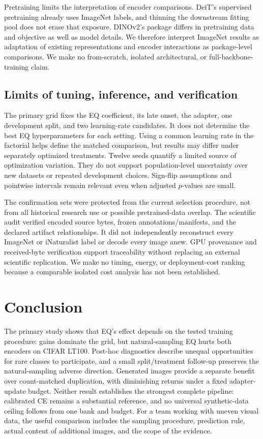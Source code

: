 \documentclass[conference]{IEEEtran}
\begin{document}
Pretraining limits the interpretation of encoder comparisons. DeiT's supervised pretraining already uses ImageNet labels, and thinning the downstream fitting pool does not erase that exposure. DINOv2's package differs in pretraining data and objective as well as model details. We therefore interpret ImageNet results as adaptation of existing representations and encoder interactions as package-level comparisons. We make no from-scratch, isolated architectural, or full-backbone-training claim.

\subsection{Limits of tuning, inference, and verification}
The primary grid fixes the EQ coefficient, its late onset, the adapter, one development split, and two learning-rate candidates. It does not determine the best EQ hyperparameters for each setting. Using a common learning rate in the factorial helps define the matched comparison, but results may differ under separately optimized treatments. Twelve seeds quantify a limited source of optimization variation. They do not support population-level uncertainty over new datasets or repeated development choices. Sign-flip assumptions and pointwise intervals remain relevant even when adjusted $p$-values are small.

The confirmation sets were protected from the current selection procedure, not from all historical research use or possible pretrained-data overlap. The scientific audit verified encoded source bytes, frozen annotations/manifests, and the declared artifact relationships. It did not independently reconstruct every ImageNet or iNaturalist label or decode every image anew. GPU provenance and received-byte verification support traceability without replacing an external scientific replication. We make no timing, energy, or deployment-cost ranking because a comparable isolated cost analysis has not been established.

\section{Conclusion}
The primary study shows that EQ's effect depends on the tested training procedure: gains dominate the grid, but natural-sampling EQ hurts both encoders on CIFAR LT100. Post-hoc diagnostics describe unequal opportunities for rare classes to participate, and a small split/treatment follow-up preserves the natural-sampling adverse direction. Generated images provide a separate benefit over count-matched duplication, with diminishing returns under a fixed adapter-update budget. Neither result establishes the strongest complete pipeline: calibrated CE remains a substantial reference, and no universal synthetic-data ceiling follows from one bank and budget. For a team working with uneven visual data, the useful comparison includes the sampling procedure, prediction rule, actual content of additional images, and the scope of the evidence.
\end{document}
